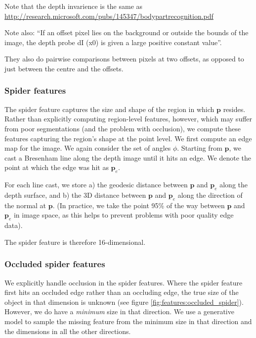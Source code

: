 \documentclass[10pt,twocolumn,letterpaper]{article}
\newcommand{\point}{\mathbf{p}}
\begin{document}
Note that the depth invarience is the same as \url{http://research.microsoft.com/pubs/145347/bodypartrecognition.pdf}

Note also: ``If an offset pixel lies on the background
or outside the bounds of the image, the depth probe dI (x0) is given a large positive constant value''.

They also do pairwise comparisons between pixels at two offsets, as opposed to just between the centre and the offsets.




\subsubsection{Spider features}
The spider feature captures the size and shape of the region in which $\point$ resides. 
Rather than explicitly computing region-level features, however, which may suffer from poor segmentations (and the problem with occlusion), we compute these features capturing the region's shape at the point level. 
We first compute an edge map for the image.
We again consider the set of angles $\phi$. Starting from $\point$, we cast a Bresenham line along the depth image until it hits an edge. 
We denote the point at which the edge was hit as $\point_{e}$.

For each line cast, we store 
a) the geodesic distance between $\point$ and $\point_{e}$ along the depth surface, and 
b) the 3D distance between $\point$ and $\point_{e}$ along the direction of the normal at $\point$. (In practice, we take the point 95\% of the way between $\point$ and $\point_{e}$ in image space, as this helps to prevent problems with poor quality edge data).

The spider feature is therefore 16-dimensional.

\subsubsection{Occluded spider features}

We explicitly handle occlusion in the spider features. Where the spider feature first hits an occluded edge rather than an occluding edge, the true size of the object in that dimension is unknown (see figure \ref{fig:features:occluded_spider}).
However, we do have a \textit{minimum} size in that direction.
We use a generative model to sample the missing feature from the minimum size in that direction and the dimensions in all the other directions.
\end{document}
